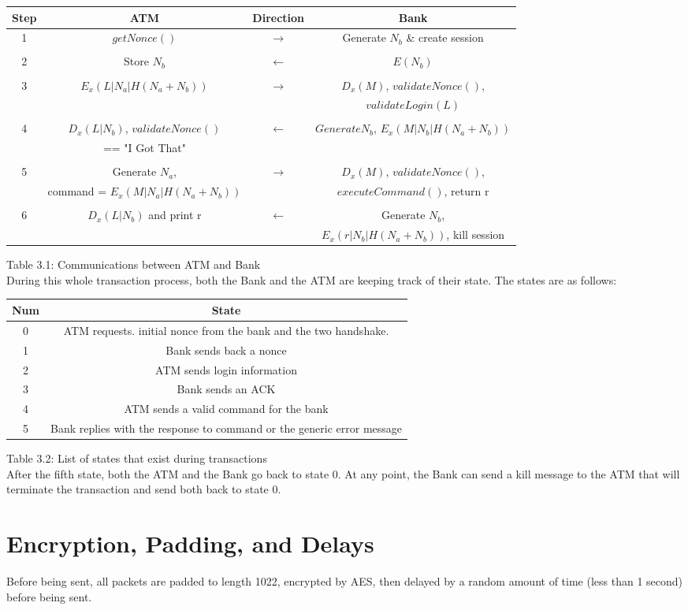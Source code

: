\documentclass[10pt,a4paper]{article}
\begin{document}
\begin{tabular}{|c|ccc|}
	\hline
Step &  ATM  & Direction & Bank \\
	\hline
1   & $getNonce()$ & $\rightarrow$ & Generate $N_b$ \& create session  \\\\
2   & Store $N_b$ & $\leftarrow$ & $E(N_b)$  \\\\
3   & $E_x(L|N_a|H(N_a + N_b))$ & $\rightarrow$ & $D_x(M)$, $validateNonce()$,\\
	& & & $validateLogin(L)$ \\\\
4   & $D_x(L|N_b)$, $validateNonce()$ & $\leftarrow$ & $Generate N_b$, $E_x(M|N_b|H(N_a+N_b))$ \\  & == "I Got That" & &\\\\
5   & Generate $N_a$, & $\rightarrow$ & $D_x(M)$, $validateNonce()$, \\
	& command = $E_x(M|N_a|H(N_a+N_b))$ & & $executeCommand()$, return r\\\\
6   & $D_x(L|N_b)$ and print r & $\leftarrow$ & Generate $N_b$, \\
	& & & $E_x(r|N_b|H(N_a+N_b))$, kill session\\
	\hline
\end{tabular}

{\footnotesize Table 3.1: Communications between ATM and Bank}\\

During this whole transaction process, both the Bank and the ATM are keeping track of their state. The states are as follows:\\

\begin{tabular}{|c|c|}
	\hline
Num & State\\
	\hline
0 & ATM requests. initial nonce from the bank and the two handshake.\\
1 & Bank sends back a nonce\\
2 & ATM sends login information\\
3 & Bank sends an ACK\\
4 & ATM sends a valid command for the bank\\
5 & Bank replies with the response to command or the generic error message\\
	\hline
\end{tabular}

{\footnotesize Table 3.2: List of states that exist during transactions}\\

After the fifth state, both the ATM and the Bank go back to state 0. At any point, the Bank can send a kill message to the ATM that will terminate the transaction and send both back to state 0.

\section{Encryption, Padding, and Delays}

Before being sent, all packets are padded to length 1022, encrypted by AES, then delayed by a random amount of time (less than 1 second) before being sent.  
\end{document}
